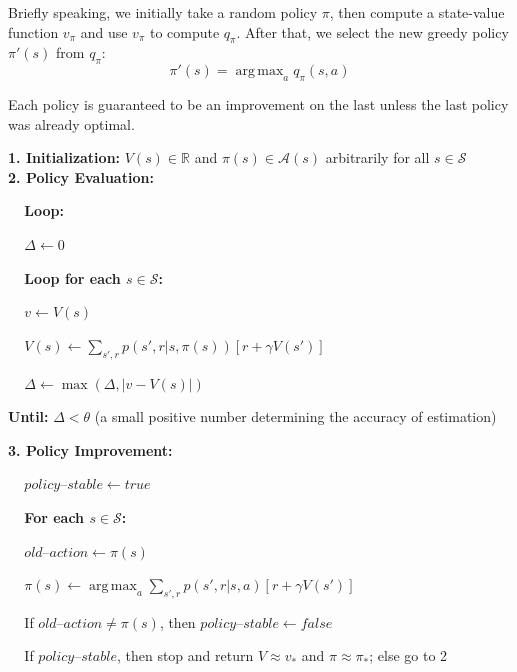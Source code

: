\documentclass[12pt, a4paper]{article}
\DeclareMathOperator*{\argmax}{arg\,max} %
\begin{document}
Briefly speaking, we initially take a random policy $\pi$, then compute a state-value function $v_{\pi}$ and use $v_{\pi}$ to compute $q_{\pi}$. After that, we select the new greedy policy $\pi'(s)$ from $q_{\pi}$:
$$\pi'(s)= \argmax_a q_{\pi}(s,a)$$

Each policy is guaranteed to be an improvement on the last unless the last policy was already optimal.


\begin{tcolorbox}[title={Policy Iteration (using iterative policy evaluation) for estimating $\pi \approx \pi_*$}]

  \textbf{1. Initialization:} $V(s) \in \mathbb{R}$ and $\pi(s) \in \mathcal{A}(s)$ arbitrarily for all $s \in \mathcal{S}$ \\

  \textbf{2. Policy Evaluation:}
  \begin{description}
      \item $\;\;\;$ \textbf{Loop:}
      \begin{description}
        \item $\;\;\;$ $\Delta \leftarrow 0$
        \item $\;\;\;$ \textbf{Loop for each $s \in \mathcal{S}$:}
        \begin{description}
          \item $\;\;\;$ $v \leftarrow V(s)$
          \item $\;\;\;$ $V(s) \leftarrow \sum_{s', r} p(s',r|s,\pi(s)) [r + \gamma V(s')]$
          \item $\;\;\;$ $\Delta \leftarrow \max (\Delta , | v - V(s) |)$
        \end{description}
      \end{description}
      \textbf{Until:} $\Delta < \theta$ (a small positive number determining the accuracy of estimation)
  \end{description}

  \textbf{3. Policy Improvement:}
  \begin{description}
      \item $\;\;\;$ $policy–stable \leftarrow true$
      \item $\;\;\;$ \textbf{For each $s \in \mathcal{S}$:}
      \begin{description}
        \item $\;\;\;$ $old–action \leftarrow \pi(s)$
        \item $\;\;\;$ $\pi(s) \leftarrow \argmax_a \sum_{s', r} p(s',r | s,a)[r + \gamma V(s')]$
        \item $\;\;\;$ If $old–action \neq \pi(s)$, then $policy–stable \leftarrow false$
      \end{description}
      \item $\;\;\;$ If $policy–stable$, then stop and return $V \approx v_*$ and $\pi \approx \pi_*$; else go to 2
  \end{description}
\end{tcolorbox}
\end{document}
